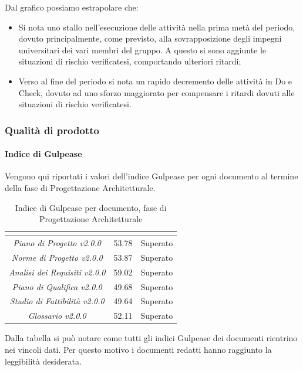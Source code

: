 Dal grafico possiamo estrapolare che:
\begin{itemize}
	\item Si nota uno stallo nell'esecuzione delle attività nella prima metà del periodo, dovuto principalmente, come previsto, alla sovrapposizione degli impegni universitari dei vari membri del gruppo. A questo si sono aggiunte le situazioni di rischio verificatesi, comportando ulteriori ritardi;
	\item Verso al fine del periodo si nota un rapido decremento delle attività in Do e Check, dovuto ad uno sforzo maggiorato per compensare i ritardi dovuti alle situazioni di rischio verificatesi.
\end{itemize}
\subsubsection{Qualità di prodotto}
\paragraph{Indice di Gulpease} \Spazio
Vengono qui riportati i valori dell'indice Gulpease per ogni documento al termine della fase di Progettazione Architetturale.
\renewcommand{\arraystretch}{1.5}
\begin{table}[H]
	\begin{center}
		\begin{tabular}{|c|c|c|}
			\hline
			\rowcolor{title_row}
			\textbf{\color{title_text}{Documento}} & \textbf{\color{title_text}{Valore indice}} & \textbf{\color{title_text}{Esito}} \\
			\hline
			\emph{Piano di Progetto v2.0.0} & {53.78} & {Superato}\\
			\hline
			\emph{Norme di Progetto v2.0.0} & {53.87} & {Superato}\\
			\hline
			\emph{Analisi dei Requisiti v2.0.0} & {59.02} & {Superato}\\
			\hline
			\emph{Piano di Qualifica v2.0.0} & {49.68} & {Superato}\\
			\hline
			\emph{Studio di Fattibilità v2.0.0} & {49.64} & {Superato}\\
			\hline
			\emph{Glossario v2.0.0} & {52.11} & {Superato}\\
			\hline
		\end{tabular}
		\caption[Esiti verifica documenti, Consolidamento e Progettazione Architetturale]{Indice di Gulpease per documento, fase di Progettazione Architetturale}
		\label{tabella:verifica documenti rp}
	\end{center}
\end{table}
\renewcommand{\arraystretch}{1}
Dalla tabella si può notare come tutti gli indici Gulpease dei documenti rientrino nei vincoli dati. Per questo motivo i documenti redatti hanno raggiunto la leggibilità desiderata.

